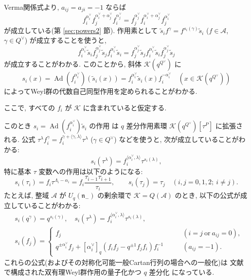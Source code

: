 \documentclass[12pt,twoside,dvipdfm]{msjproc}
\theoremstyle{definition} %
\theoremstyle{definition} %
\theoremstyle{definition} %
\numberwithin{theorem}{section}
\numberwithin{equation}{section}
\numberwithin{figure}{section}
\numberwithin{table}{section}
\newcommand\secref[1]{第 \ref{#1} 節}
\newcommand\nil{\mathfrak{n}}
\newcommand\bra{\langle}
\newcommand\ket{\rangle}
\newcommand\A{\mathcal{A}}
\newcommand\K{\mathcal{K}}
\newcommand\Ad{\mathop{\mathrm{Ad}}\nolimits}
\newcommand\ts{{\tilde{s}}}
\newcommand\av{\alpha^\vee}
\newcommand\Qv{{Q^\vee}}
\begin{document}
Verma関係式より, $a_{ij}=a_{ji}=-1$ ならば 
\begin{equation*}
   f_i^{\av_i} f_j^{\av_i+\av_j} f_i^{\av_j}
 = f_j^{\av_j} f_i^{\av_i+\av_j} f_j^{\av_i}
\end{equation*}
が成立している(\secref{sec:powers2}). 
作用素として $\ts_i f^\gamma = f^{s_i(\gamma)} \ts_i$ ($f\in\A$, $\gamma\in\Qv$) 
が成立することを使うと,
\begin{equation*}
   f_i^{\av_i}\ts_i f_j^{\av_j}\ts_j f_i^{\av_i}\ts_i
 = f_j^{\av_j}\ts_j f_i^{\av_i}\ts_i f_j^{\av_j}\ts_j
\end{equation*}
が成立することがわかる. このことから, 斜体 $\K(q^\Qv)$ に
\begin{equation*}
  s_i(x) = \Ad(f_i^{\av_i})(\ts_i(x)) = f_i^{\av_i} \ts_i(x) f_i^{-\av_i}
  \quad (x\in\K(q^\Qv))
\end{equation*}
によってWeyl群の代数自己同型作用を定められることがわかる.

ここで, すべての $f_i$ が $\K$ に含まれていると仮定する.

このとき $s_i=\Ad(f_i^{\av_i})\ts_i$ の作用
は $q$ 差分作用素環 $\K(q^\Qv)[\tau^P]$ に拡張される.
公式 $\tau^\lambda f_i^{\gamma} = f_i^{\gamma+\bra\gamma,\lambda\ket}\tau^\lambda$ 
($\gamma\in\Qv$) などを使うと,
次が成立していることがわかる:
\begin{equation*}
 s_i(\tau^\lambda) = f_i^{\bra\av_i,\lambda\ket}\tau^{s_i(\lambda)},
\end{equation*}
特に基本 $\tau$ 変数への作用は以下のようになる:
\begin{equation*}
 s_i(\tau_i)=f_i\tau^{\Lambda_i-\alpha_i}
 = f_i \frac{\tau_{i-1}\tau_{i+1}}{\tau_i},
 \qquad 
 s_i(\tau_j)=\tau_j \quad (i,j=0,1,2;\ i\ne j).
\end{equation*}
たとえば, 整域 $\A$ が $U_q(\nil_-)$ の剰余環で $\K=Q(\A)$ のとき, 
以下の公式が成立していることがわかる:
\begin{align*}
 &
 s_i(q^\gamma) = q^{s_i(\gamma)},
 \quad
 s_i(\tau^\lambda) = f_i^{\bra\av_i,\lambda\ket}\tau^{s_i(\lambda)},
 \\ &
 s_i(f_j) = 
 \begin{cases}
  f_j & \qquad (i=j \ \text{or}\ a_{ij}=0), \\
  q^{\pm\av_i}f_j + [\av_i]_q(f_if_j-q^{\pm1}f_jf_i)f_i^{-1} & \qquad (a_{ij}=-1).
 \end{cases}
\end{align*}
これらの公式(およびその対称化可能一般Cartan行列の場合への一般化)は
文献 \cite{NY-BWA} で構成された双有理Weyl群作用の量子化かつ $q$ 差分化
になっている.
\end{document}
